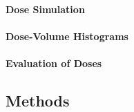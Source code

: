 \paragraph{Dose Simulation}

\paragraph{Dose-Volume Histograms}

\paragraph{Evaluation of Doses}


\subsection{Methods}

